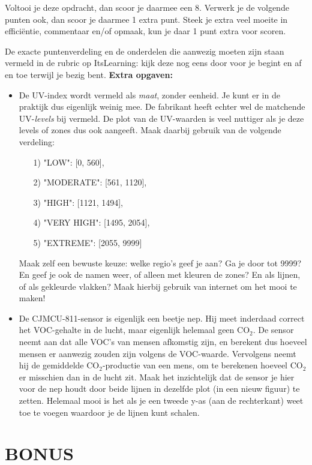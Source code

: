 \documentclass[a4paper,11pt, fleqn]{article}
\newcommand{\ditwc}{Naam van het huidige werkcollege}
\begin{document}
Voltooi je deze opdracht, dan scoor je daarmee een 8. Verwerk je de volgende punten ook, dan scoor je daarmee 1 extra punt. Steek je extra veel moeite in effici\"entie, commentaar en/of opmaak, kun je daar 1 punt extra voor scoren.

De exacte puntenverdeling en de onderdelen die aanwezig moeten zijn staan vermeld in de rubric op ItsLearning: kijk deze nog eens door voor je begint en af en toe terwijl je bezig bent.
\bigbreak
{\bf Extra opgaven:}
\begin{itemize}
	\item De UV-index wordt vermeld als {\it maat}, zonder eenheid. Je kunt er in de praktijk dus eigenlijk weinig mee. De fabrikant heeft echter wel de matchende UV-{\it levels} bij vermeld. De plot van de UV-waarden is veel nuttiger als je deze levels of zones dus ook aangeeft. Maak daarbij gebruik van de volgende verdeling:
	\begin{itemize}
		\item[1)] "LOW": [0, 560],
		\item[2)] "MODERATE": [561, 1120],
		\item[3)] "HIGH": [1121, 1494],
		\item[4)] "VERY HIGH": [1495, 2054],
		\item[5)] "EXTREME": [2055, 9999] 
	\end{itemize}
	Maak zelf een bewuste keuze: welke regio's geef je aan? Ga je door tot 9999? En geef je ook de namen weer, of alleen met kleuren de zones? En als lijnen, of als gekleurde vlakken? Maak hierbij gebruik van internet om het mooi te maken!
	\item De CJMCU-811-sensor is eigenlijk een beetje nep. Hij meet inderdaad correct het VOC-gehalte in de lucht, maar eigenlijk helemaal geen CO$_2$. De sensor neemt aan dat alle VOC's van mensen afkomstig zijn, en berekent dus hoeveel mensen er aanwezig zouden zijn volgens de VOC-waarde. Vervolgens neemt hij de gemiddelde CO$_2$-productie van een mens, om te berekenen hoeveel CO$_2$ er misschien dan in de lucht zit. Maak het inzichtelijk dat de sensor je hier voor de nep houdt door beide lijnen in dezelfde plot (in een nieuw figuur) te zetten. Helemaal mooi is het als je een tweede y-as (aan de rechterkant) weet toe te voegen waardoor je de lijnen kunt schalen.
\end{itemize}


\clearpage
\renewcommand{\ditwc}{BONUS}
\section{BONUS}
\end{document}
